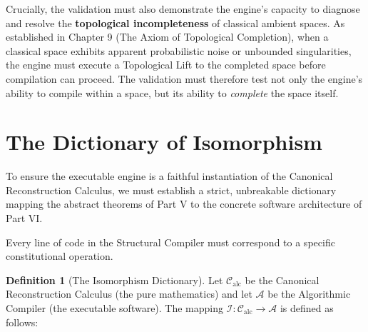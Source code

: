\documentclass[12pt,openany]{extbook}
\theoremstyle{plain}
\theoremstyle{definition}
\newtheorem{definition}{Definition}[chapter]
\begin{document}
Crucially, the validation must also demonstrate the engine's capacity to diagnose and resolve the \textbf{topological incompleteness} of classical ambient spaces. As established in Chapter 9 (The Axiom of Topological Completion), when a classical space exhibits apparent probabilistic noise or unbounded singularities, the engine must execute a Topological Lift to the completed space before compilation can proceed. The validation must therefore test not only the engine's ability to compile within a space, but its ability to \emph{complete} the space itself.

\section{The Dictionary of Isomorphism}

To ensure the executable engine is a faithful instantiation of the Canonical Reconstruction Calculus, we must establish a strict, unbreakable dictionary mapping the abstract theorems of Part V to the concrete software architecture of Part VI.

Every line of code in the Structural Compiler must correspond to a specific constitutional operation.

\begin{definition}[The Isomorphism Dictionary]
Let $\mathcal{C}_{\mathrm{alc}}$ be the Canonical Reconstruction Calculus (the pure mathematics) and let $\mathcal{A}$ be the Algorithmic Compiler (the executable software). The mapping $\mathcal{I}: \mathcal{C}_{\mathrm{alc}} \to \mathcal{A}$ is defined as follows:
\end{definition}
\end{document}
